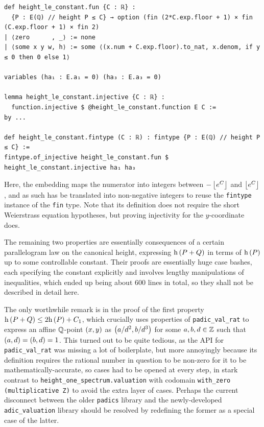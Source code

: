 \begin{lstlisting}[frame=single]
def height_le_constant.fun {C : ℝ} :
  {P : E(ℚ) // height P ≤ C} → option (fin (2*C.exp.floor + 1) × fin (C.exp.floor + 1) × fin 2)
| ⟨zero      , _⟩ := none
| ⟨some x y w, h⟩ := some ⟨(x.num + C.exp.floor).to_nat, x.denom, if y ≤ 0 then 0 else 1⟩

variables (ha₁ : E.a₁ = 0) (ha₃ : E.a₃ = 0)

lemma height_le_constant.injective {C : ℝ} :
  function.injective $ @height_le_constant.function E C :=
by ...

def height_le_constant.fintype (C : ℝ) : fintype {P : E(ℚ) // height P ≤ C} :=
fintype.of_injective height_le_constant.fun $ height_le_constant.injective ha₁ ha₃
\end{lstlisting}

Here, the embedding maps the numerator into integers between $ -\left\lfloor e^C \right\rfloor $ and $ \left\lfloor e^C \right\rfloor $, and as such has be translated into non-negative integers to reuse the \texttt{fintype} instance of the \texttt{fin} type. Note that its definition does not require the short Weierstrass equation hypotheses, but proving injectivity for the $ y $-coordinate does.

\pagebreak

The remaining two properties are essentially consequences of a certain parallelogram law on the canonical height, expressing $ \h\br{P + Q} $ in terms of $ \h\br{P} $ up to some controllable constant. Their proofs are essentially huge case bashes, each specifying the constant explicitly and involves lengthy manipulations of inequalities, which ended up being about 600 lines in total, so they shall not be described in detail here.

The only worthwhile remark is in the proof of the first property $ \h\br{P + Q} \le 2\h\br{P} + C_1 $, which crucially uses properties of \texttt{padic\_val\_rat} to express an affine $ \mathbb{Q} $-point $ \br{x, y} $ as $ \br{a / d^2, b / d^3} $ for some $ a, b, d \in \mathbb{Z} $ such that $ \br{a, d} = \br{b, d} = 1 $. This turned out to be quite tedious, as the API for \texttt{padic\_val\_rat} was missing a lot of boilerplate, but more annoyingly because its definition requires the rational number in question to be non-zero for it to be mathematically-accurate, so cases had to be opened at every step, in stark contrast to \texttt{height\_one\_spectrum.valuation} with codomain \texttt{with\_zero (multiplicative Z)} to avoid the extra layer of cases. Perhaps the current disconnect between the older \texttt{padics} library and the newly-developed \texttt{adic\_valuation} library should be resolved by redefining the former as a special case of the latter.


